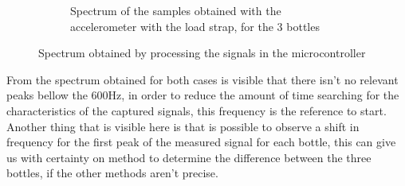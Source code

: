 \begin{figure}[]
\begin{subfigure}{0.45\textwidth}
        \caption{Spectrum of the samples obtained with the accelerometer with the load strap, for the 3 bottles}{}
        \label{subfig:specAccuC}
    \end{subfigure}
    \caption{Spectrum obtained by processing the signals in the microcontroller}{}
    \label{fig:specuC}
\end{figure}

From the spectrum obtained for both cases is visible that there isn't no relevant peaks bellow the 600Hz, in order to reduce the amount of time searching for the characteristics of the captured signals, this frequency is the reference to start. Another thing that is visible here is that is possible to observe a shift in frequency for the first peak of the measured signal for each bottle, this can give us with certainty on method to determine the difference between the three bottles, if the other methods aren't precise.

